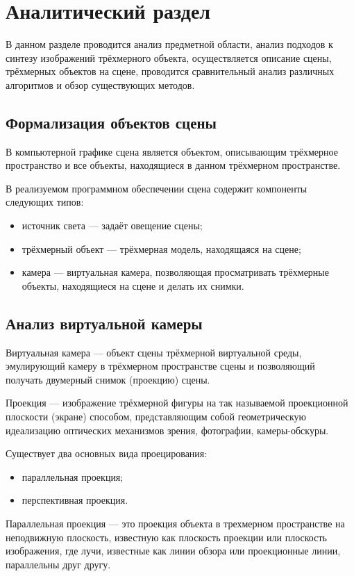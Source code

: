 \chapter{Аналитический раздел}
В данном разделе проводится анализ предметной области, анализ подходов к синтезу изображений трёхмерного объекта, осуществляется описание сцены, трёхмерных объектов на сцене, проводится сравнительный анализ различных алгоритмов и обзор существующих методов.

\section{Формализация объектов сцены}
В компьютерной графике сцена является объектом, описывающим трёхмерное пространство и все объекты, находящиеся в данном трёхмерном пространстве.

В реализуемом программном обеспечении сцена содержит компоненты следующих типов:
\begin{itemize}
 \item источник света --- задаёт овещение сцены;
 \item трёхмерный объект --- трёхмерная модель, находящаяся на сцене;
 \item камера --- виртуальная камера, позволяющая просматривать трёхмерные объекты, находящиеся на сцене и делать их снимки.
\end{itemize}

\section{Анализ виртуальной камеры}
Виртуальная камера --- объект сцены трёхмерной виртуальной среды, эмулирующий камеру в трёхмерном пространстве сцены и позволяющий получать двумерный снимок (проекцию) сцены.

Проекция --- изображение трёхмерной фигуры на так называемой проекционной плоскости (экране) способом, представляющим собой геометрическую идеализацию оптических механизмов зрения, фотографии, камеры-обскуры.

Существует два основных вида проецирования:
\begin{itemize}
\item параллельная проекция;
\item перспективная проекция.
\end{itemize}

Параллельная проекция --- это проекция объекта в трехмерном пространстве на неподвижную плоскость, известную как плоскость проекции или плоскость изображения, где лучи, известные как линии обзора или проекционные линии, параллельны друг другу. 


